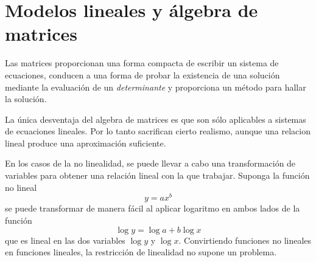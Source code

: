 \section{Modelos lineales y álgebra de matrices}

Las matrices proporcionan una forma compacta de escribir un sistema de ecuaciones, conducen a una forma de probar la existencia de una solución mediante la evaluación de un \textit{determinante} y proporciona un método para hallar la solución.

La única desventaja del algebra de matrices es que son sólo aplicables a sistemas de ecuaciones lineales. Por lo tanto sacrifican cierto realismo, aunque una relacion lineal produce una aproximación suficiente.

En los casos de la no linealidad, se puede llevar a cabo una transformación de variables para obtener una relación lineal con la que trabajar. Suponga la función no lineal 
\[
y=ax^b
\]
se puede transformar de manera fácil al aplicar logaritmo en ambos lados de la función
\[
\log y = \log a+b\log x
\]
que es lineal en las dos variables \(\log y\) y \(\log x\). Convirtiendo funciones no lineales en funciones lineales, la restricción de linealidad no supone un problema.




